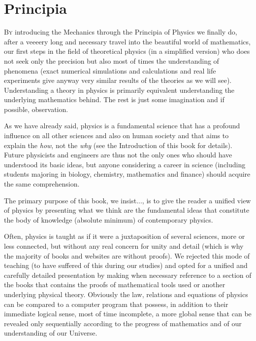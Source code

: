 	\newpage
	\thispagestyle{empty}
	\mbox{}
	\section{Principia}
	\lettrine[lines=4]{\color{BrickRed}B}y introducing the Mechanics through the Principia of Physics we finally do, after a veeeery long and necessary travel into the beautiful world of mathematics, our first steps in the field of theoretical physics (in a simplified version) who does not seek only the precision but also most of times the understanding of phenomena (exact numerical simulations and calculations and real life experiments give anyway very similar results of the theories as we will see). Understanding a theory in physics is primarily equivalent understanding the underlying mathematics behind. The rest is just some imagination and if possible, observation.
	
	As we have already said, physics is a fundamental science that has a profound influence on all other sciences and also on human society and that aims to explain the \textit{how}, not the \textit{why} (see the Introduction of this book for details). Future physicists and engineers are thus not the only ones who should have understood its basic ideas, but anyone considering a career in science (including students majoring in biology, chemistry, mathematics and finance) should acquire the same comprehension.
	
	The primary purpose of this book, we insist..., is to give the reader a unified view of physics by presenting what we think are the fundamental ideas that constitute the body of knowledge (absolute minimum) of contemporary physics.
	
	Often, physics is taught as if it were a juxtaposition of several sciences, more or less connected, but without any real concern for unity and detail (which is why the majority of books and websites are without proofs). We rejected this mode of teaching (to have suffered of this during our studies) and opted for a unified and carefully detailed presentation by making when necessary reference to a section of the books that contains the proofs of mathematical tools used or another underlying physical theory. Obviously the law, relations and equations of physics can be compared to a computer program that possess, in addition to their immediate logical sense, most of time incomplete, a more global sense that can be revealed only sequentially according to the progress of mathematics and of our understanding of our Universe.
	
